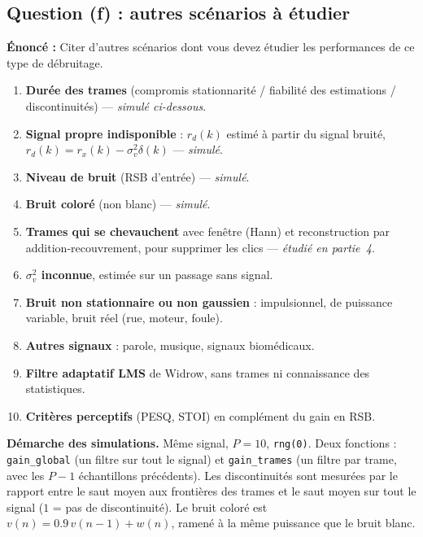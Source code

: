 \subsection{Question (f) : autres scénarios à étudier}

\begin{enonce}
\textbf{Énoncé :} Citer d'autres scénarios dont vous devez étudier les performances de ce type de débruitage.
\end{enonce}

\begin{resultat}
\begin{enumerate}
  \item \textbf{Durée des trames} (compromis stationnarité / fiabilité des estimations / discontinuités) --- \emph{simulé ci-dessous}.
  \item \textbf{Signal propre indisponible} : $r_d(k)$ estimé à partir du signal bruité, $r_d(k)=r_x(k)-\sigma_v^2\delta(k)$ --- \emph{simulé}.
  \item \textbf{Niveau de bruit} (RSB d'entrée) --- \emph{simulé}.
  \item \textbf{Bruit coloré} (non blanc) --- \emph{simulé}.
  \item \textbf{Trames qui se chevauchent} avec fenêtre (Hann) et reconstruction par addition-recouvrement, pour supprimer les clics --- \emph{étudié en partie~4}.
  \item \textbf{$\sigma_v^2$ inconnue}, estimée sur un passage sans signal.
  \item \textbf{Bruit non stationnaire ou non gaussien} : impulsionnel, de puissance variable, bruit réel (rue, moteur, foule).
  \item \textbf{Autres signaux} : parole, musique, signaux biomédicaux.
  \item \textbf{Filtre adaptatif LMS} de Widrow, sans trames ni connaissance des statistiques.
  \item \textbf{Critères perceptifs} (PESQ, STOI) en complément du gain en RSB.
\end{enumerate}
\end{resultat}

\textbf{Démarche des simulations.} Même signal, $P=10$, \texttt{rng(0)}. Deux fonctions : \texttt{gain\_global} (un filtre sur tout le signal) et \texttt{gain\_trames} (un filtre par trame, avec les $P-1$ échantillons précédents). Les discontinuités sont mesurées par le rapport entre le saut moyen aux frontières des trames et le saut moyen sur tout le signal ($1$ = pas de discontinuité). Le bruit coloré est $v(n)=0.9\,v(n-1)+w(n)$, ramené à la même puissance que le bruit blanc.

